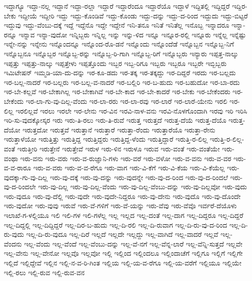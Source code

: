 ಇದ್ದಾಗ್ಯೂ
ಇದ್ದಾ-ನಲ್ಲ
ಇದ್ದಾನೆ
ಇದ್ದಾ-ರಲ್ಲಾ
ಇದ್ದಾರೆ
ಇದ್ದಾರೆಂದೂ
ಇದ್ದಾರೆಯೊ
ಇದ್ದಾಳೆ
ಇದ್ದಿತಲ್ಲಿ
ಇದ್ದಿದ್ದರೆ
ಇದ್ದಿರ-ಬೇಕು
ಇದ್ದೀಯೆ
ಇದ್ದೀರಿ
ಇದ್ದು
ಇದ್ದು-ಕೊಂಡಿವೆ
ಇದ್ದು-ಕೊಂಡು
ಇದ್ದು-ದನ್ನು
ಇದ್ದು-ದ-ರಿಂದ
ಇದ್ದುದು
ಇದ್ದು-ಬಿಟ್ಟರೆ
ಇದ್ದುವು
ಇದ್ದು-ವೆಂಬು-ದಕ್ಕೆ
ಇದ್ದೆ
ಇದ್ದೆನೊ
ಇದ್ದೇ
ಇದ್ದೇನೆ
ಇನಿ-ತನೂ
ಇನಿತೆ
ಇನಿತೆಲ್ಲ
ಇನೊಬ್ಬ
ಇನ್ನಾದರೂ
ಇನ್ನಾ-ರನ್ನೂ
ಇನ್ನಾವ
ಇನ್ನಾ-ವುದೋ
ಇನ್ನಿಬ್ಬರು
ಇನ್ನಿಲ್ಲ
ಇನ್ನು
ಇನ್ನು-ಳಿದ
ಇನ್ನೂ
ಇನ್ನೂರ-ರಲ್ಲಿ
ಇನ್ನೂರು
ಇನ್ನೆಲ್ಲ
ಇನ್ನೆಷ್ಟು
ಇನ್ನೇ-ನನ್ನು
ಇನ್ನೇನು
ಇನ್ನೊಂದನ್ನೂ
ಇನ್ನೊಂದ-ರೊ-ಡನೆ
ಇನ್ನೊಂದು
ಇನ್ನೊಂದೆಡೆ
ಇನ್ನೊಬ್ಬನ
ಇನ್ನೊಬ್ಬ-ನಿಗೆ
ಇನ್ನೊಬ್ಬನೂ
ಇನ್ನೊಬ್ಬರ
ಇನ್ನೊಬ್ಬ-ರನ್ನು
ಇನ್ನೊಬ್ಬ-ರಿ-ಗಾಗಿ
ಇನ್ನೊಬ್ಬ-ರಿಗೆ
ಇನ್ನೊಬ್ಬರು
ಇನ್ಯಾರು
ಇಪ್ಪತ್ತ-ನಾಲ್ಕು
ಇಪ್ಪತ್ತು
ಇಪ್ಪತ್ತು-ನಾಲ್ಕು
ಇಪ್ಪತ್ತೇಳು
ಇಪ್ಪತ್ತೊಂದು
ಇಬ್ಬರ
ಇಬ್ಬ-ರಿಗೂ
ಇಬ್ಬರು
ಇಬ್ಬರೂ
ಇಬ್ಬರೇ
ಇಬ್ಬಿಬ್ಬರು
ಇಮಿಟೇಷನ್
ಇಮ್ಮಡಿ-ಯಾ-ದು-ದನ್ನು
ಇರ-ಕೂ-ಡದು
ಇರ-ತಕ್ಕ
ಇರ-ತಕ್ಕದ್ದು
ಇರ-ದಿದ್ದರೆ
ಇರದು
ಇರ-ಬಲ್ಲದು
ಇರ-ಬಲ್ಲ-ನಾದರೆ
ಇರ-ಬಲ್ಲರು
ಇರ-ಬಲ್ಲ-ವ-ನಾದರೆ
ಇರ-ಬಲ್ಲಿರಿ
ಇರ-ಬ-ಹುದು
ಇರ-ಬಹುದೋ
ಇರ-ಬಾ-ರದು
ಇರ-ಬೇ-ಕಲ್ಲವೆ
ಇರ-ಬೇಕಾಗಿಲ್ಲ
ಇರ-ಬೇಕಾಗಿವೆ
ಇರ-ಬೇ-ಕಾದ
ಇರ-ಬೇ-ಕಾದರೆ
ಇರ-ಬೇಕು
ಇರ-ಬೇಕೆಂದರು
ಇರ-ಬೇಕೆಂದು
ಇರ-ಲಾ-ಗು-ವು-ದಿಲ್ಲ-ವೆಂದು
ಇರ-ಲಾ-ರರು
ಇರ-ಲಾ-ರವು
ಇರ-ಲಾರೆ
ಇರ-ಲಾರೆ-ಯೇನು
ಇರಲಿ
ಇರ-ಲಿಲ್ಲ
ಇರಲಿಲ್ಲವೆ
ಇರಲು
ಇರಲೇ
ಇರ-ಲೇನು
ಇರ-ವಿನ
ಇರವಿ-ನಾಳ-ವನು
ಇರವಿ-ನೊಳಗೊಂದಾಗಿ
ಇರವು
ಇರಿ
ಇರಿಸಿ
ಇರಿ-ಸು-ವುದಕ್ಕೋಸ್ಕರ
ಇರು
ಇರು-ತಿ-ರಲು
ಇರು-ತಿ-ರುವೆ
ಇರುತ್ತ
ಇರುತ್ತದೆ
ಇರುತ್ತ-ದೆಯೆ
ಇರುತ್ತ-ದೆಯೊ
ಇರುತ್ತ-ದೆಯೋ
ಇರುತ್ತದೋ
ಇರುತ್ತವೆ
ಇರುತ್ತಾನೆ
ಇರುತ್ತಾರೆ
ಇರುತ್ತಾ-ರೆಂದು
ಇರುತ್ತಾರೆಯೊ
ಇರುತ್ತಾ-ರೇನು
ಇರುತ್ತಾಳೆಯೋ
ಇರುತ್ತಿತ್ತು
ಇರುತ್ತಿದ್ದ
ಇರುತ್ತಿದ್ದರು
ಇರುತ್ತಿದ್ದ-ಳೆಂದು
ಇರುತ್ತಿದ್ದಾರೆ
ಇರುತ್ತಿ-ರ-ಲಿಲ್ಲ
ಇರುತ್ತಿ-ರ-ಲಿಲ್ಲ-ವಂತೆ
ಇರುತ್ತೀರಿ
ಇರುತ್ತೇನೆ
ಇರುತ್ತೇವೆ
ಇರುಳ
ಇರು-ಳಿನ
ಇರುಳೂ
ಇರುವ
ಇರು-ವಂತೆ
ಇರು-ವಂತೆಯೇ
ಇರು-ವಂಥಾ
ಇರು-ವನು
ಇರು-ವರು
ಇರು-ವ-ರುಜ್ಞಾನಿ-ಗಳು
ಇರು-ವರೆ
ಇರು-ವಳೋ
ಇರು-ವ-ವನು
ಇರು-ವ-ವರ
ಇರು-ವ-ವ-ರಾರೂ
ಇರು-ವ-ವರು
ಇರು-ವ-ವ-ರೆಗೂ
ಇರು-ವಾಗ
ಇರು-ವಿ-ಕೆಗೆ
ಇರು-ವಿ-ಕೆಯ
ಇರು-ವಿ-ಕೆಯೆಲ್ಲ
ಇರು-ವುದಕ್ಕಾ-ಗು-ವು-ದಿಲ್ಲ
ಇರು-ವು-ದಕ್ಕೆ
ಇರು-ವು-ದನ್ನು
ಇರು-ವುದನ್ನೇ
ಇರು-ವು-ದ-ರಿಂದ
ಇರು-ವು-ದ-ರಿಂದಲೆ
ಇರು-ವು-ದ-ರಿಂದಲೇ
ಇರು-ವು-ದಿಲ್ಲ
ಇರು-ವು-ದಿಲ್ಲ-ವೆಂದು
ಇರು-ವು-ದಿಲ್ಲ-ವೆಂಬು-ದನ್ನು
ಇರು-ವು-ದಿಲ್ಲವೋ
ಇರು-ವುದು
ಇರು-ವುದೂ
ಇರು-ವು-ದೆಲ್ಲಿ
ಇರು-ವುದೇ
ಇರು-ವುದೇ-ನಿದ್ದರೂ
ಇರು-ವು-ದೇನು
ಇರು-ವುದೊ
ಇರು-ವು-ದೊಂದೇ
ಇರು-ವುದೋ
ಇರು-ವುವು
ಇರುವೆ
ಇರು-ವೆ-ಗಳಿಗೆ
ಇರು-ವೆ-ಯನ್ನು
ಇರು-ವೆವು
ಇರು-ವೆವೊ
ಇರ್ವರೆ-ದೆಯೊಳು
ಇಲಾಖೆ-ಗ-ಳಲ್ಲಿಯೂ
ಇಲಿ
ಇಲಿ-ಗಳ
ಇಲಿ-ಗಳೆಲ್ಲ
ಇಲ್ಲ
ಇಲ್ಲದ
ಇಲ್ಲ-ದಂತೆ
ಇಲ್ಲ-ದಾಗ
ಇಲ್ಲ-ದಿದ್ದರೂ
ಇಲ್ಲ-ದಿದ್ದರೆ
ಇಲ್ಲ-ದಿದ್ದಲ್ಲಿ
ಇಲ್ಲ-ದಿದ್ದಿದ್ದರೆ
ಇಲ್ಲ-ದಿರ-ಬ-ಹುದು
ಇಲ್ಲ-ದಿ-ರಲಿ
ಇಲ್ಲ-ದಿ-ರುವಾಗ
ಇಲ್ಲ-ದಿ-ರು-ವು-ದ-ರಿಂದ
ಇಲ್ಲ-ದಿ-ರು-ವುದು
ಇಲ್ಲ-ದಿ-ರು-ವುದೂ
ಇಲ್ಲ-ದಿರೆ
ಇಲ್ಲದೆ
ಇಲ್ಲದೇ
ಇಲ್ಲದ್ದು
ಇಲ್ಲ-ವಾಗಿದೆ
ಇಲ್ಲ-ವಾದರೆ
ಇಲ್ಲವೆ
ಇಲ್ಲ-ವೆಂದನು
ಇಲ್ಲ-ವೆಂದು
ಇಲ್ಲ-ವೆಂದೆ
ಇಲ್ಲ-ವೆಂಬು-ದನ್ನು
ಇಲ್ಲ-ವೆ-ನಗೆ
ಇಲ್ಲ-ವೆನ್ನ-ಲಾರೆ
ಇಲ್ಲ-ವೆನ್ನಿ-ಸುತ್ತದೆ
ಇಲ್ಲವೇ
ಇಲ್ಲ-ವೇನು
ಇಲ್ಲ-ವೇನೋ
ಇಲ್ಲವೊ
ಇಲ್ಲವೋ
ಇಲ್ಲಿ
ಇಲ್ಲಿಂದ
ಇಲ್ಲಿಂದಲೂ
ಇಲ್ಲಿಂದಾಚೆಗೆ
ಇಲ್ಲಿಗೂ
ಇಲ್ಲಿಗೆ
ಇಲ್ಲಿಗೇ
ಇಲ್ಲಿದೆ
ಇಲ್ಲಿದ್ದೇವೆ
ಇಲ್ಲಿನ
ಇಲ್ಲಿ-ನ-ವ-ರಿ-ಗಿಂತ
ಇಲ್ಲಿಯ
ಇಲ್ಲಿ-ಯ-ವ-ರೆಗೂ
ಇಲ್ಲಿ-ಯ-ವರೆಗೆ
ಇಲ್ಲಿಯೂ
ಇಲ್ಲಿಯೇ
ಇಲ್ಲಿ-ರಲು
ಇಲ್ಲಿ-ರುವ
ಇಲ್ಲಿ-ರುವ-ವನ

